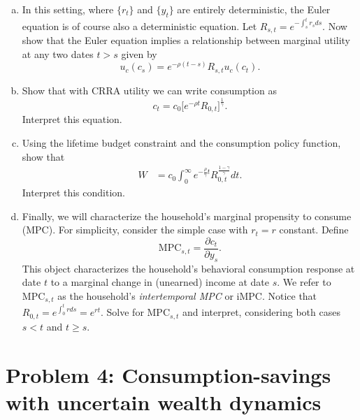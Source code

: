 \documentclass[11pt]{extarticle}
\theoremstyle{plain}
\theoremstyle{definition}
\begin{document}
\begin{enumerate}[(a)]
\item In this setting, where $\{r_t\}$ and $\{y_t\}$ are entirely deterministic, the Euler equation is of course also a deterministic equation. Let $R_{s,t} = e^{-\int_s^t r_s ds}$. Now show that the Euler equation implies a relationship between marginal utility at any two dates $t > s$ given by
\begin{equation*}
	u_c(c_s) = e^{- \rho (t-s)} R_{s,t} u_c(c_t). 
\end{equation*}


\item Show that with CRRA utility we can write consumption as 
\begin{equation*}
	c_t = c_0 \bigg[ e^{- \rho t} R_{0,t} \bigg]^\frac{1}{\gamma} .
\end{equation*}
Interpret this equation. 


\item Using the lifetime budget constraint and the consumption policy function, show that 
\begin{align*}
	W &= c_0 \int_0^\infty e^{- \frac{\rho}{\gamma} t} R_{0,t}^\frac{1-\gamma}{\gamma} dt.
\end{align*}
Interpret this condition. 


\item Finally, we will characterize the household's marginal propensity to consume (MPC). For simplicity, consider the simple case with $r_t = r$ constant. Define 
\begin{equation*}
	\text{MPC}_{s, t} = \frac{\partial c_t}{\partial y_s}. 
\end{equation*}
This object characterizes the household's behavioral consumption response at date $t$ to a marginal change in (unearned) income at date $s$. We refer to $\text{MPC}_{s, t}$ as the household's \textit{intertemporal MPC} or iMPC. Notice that $R_{0, t} = e^{\int_0^t r ds } = e^{ r t}$. Solve for $\text{MPC}_{s, t}$ and interpret, considering both cases $s < t$ and $t \geq s$. 

\end{enumerate}




\newpage
\section*{Problem 4: Consumption-savings with uncertain wealth dynamics}
\end{document}
